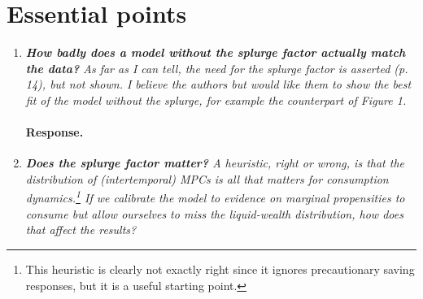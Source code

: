 \documentclass[12pt,letterpaper,english]{article}
\begin{document}
\section{Essential points}
\begin{enumerate}
	
%		
%		
%		
	
	\item \textit{\textbf{How badly does a model without the splurge factor actually match the	data?} As far as I can tell, the need for the splurge factor is asserted (p. 14), but not shown. I believe the authors but would like them to show the best fit of the model without the splurge, for example the counterpart of Figure 1. }
	
	\paragraph{Response.} 
	
	\item \textit{\textbf{Does the splurge factor matter?} A heuristic, right or wrong, is that the distribution of (intertemporal) MPCs is all that matters for consumption	dynamics.\footnote{This heuristic is clearly not exactly right since it ignores precautionary saving responses,	but it is a useful starting point.} If we calibrate the model to evidence on marginal propensities to consume but allow ourselves to miss the liquid-wealth distribution, how does that affect the results?}
		

\end{enumerate}
\end{document}
